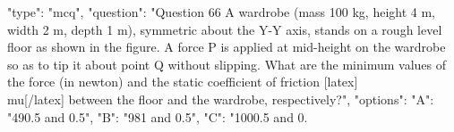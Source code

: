   {
    "type": "mcq",
    "question": "Question 66 A wardrobe (mass 100 kg, height 4 m, width 2 m, depth 1 m), symmetric about the Y-Y axis, stands on a rough level floor as shown in the figure.  A force P is applied at mid-height on the wardrobe so as to tip it about point Q without slipping. What are the minimum values of the force (in newton) and the static coefficient of friction [latex]\\mu[/latex] between the floor and the wardrobe, respectively?",
    "options": {
      "A": "490.5 and 0.5",
      "B": "981 and 0.5",
      "C": "1000.5 and 0.}}
